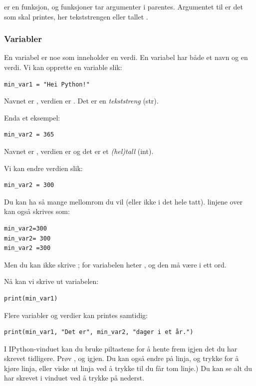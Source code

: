  er en funksjon, og funksjoner tar argumenter i parentes. Argumentet til  er det som skal printes, her tekststrengen  eller tallet .

\subsubsection{Variabler}
En variabel er noe som inneholder en verdi. En variabel har både et navn og en verdi. Vi kan opprette en variable slik:

\begin{lstlisting}
min_var1 = "Hei Python!"
\end{lstlisting}

Navnet er , verdien er . Det er en \emph{tekststreng} (str).

Enda et eksempel:
\begin{lstlisting}
min_var2 = 365
\end{lstlisting}

Navnet er , verdien er  og det er et \emph{(hel)tall} (int).

Vi kan endre verdien slik:
\begin{lstlisting}
min_var2 = 300
\end{lstlisting}

Du kan ha så mange mellomrom du vil (eller ikke i det hele tatt). linjene over kan også skrives som: 
\begin{lstlisting}
min_var2=300
min_var2= 300
min_var2 =300
\end{lstlisting}

Men du kan ikke skrive ; for variabelen heter , og den må være i ett ord. 

Nå kan vi skrive ut variabelen:
\begin{lstlisting}
print(min_var1)
\end{lstlisting}
Flere variabler og verdier kan printes samtidig:
\begin{lstlisting}
print(min_var1, "Det er", min_var2, "dager i et år.")
\end{lstlisting}

I IPython-vinduet kan du bruke piltastene for å hente frem igjen det du har skrevet tidligere. Prøv , og  igjen. Du kan også endre på linja, og trykke  for å kjøre linja, eller viske ut linja ved å trykke  til du får tom linje.) Du kan se alt du har skrevet i vinduet ved å trykke på  nederst.

